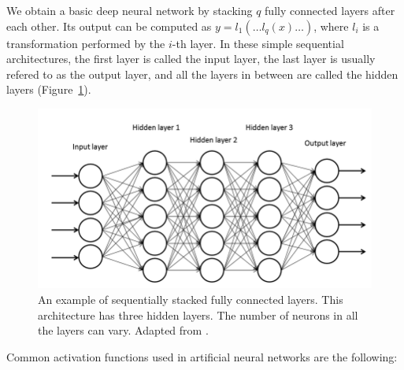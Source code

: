 We obtain a basic deep neural network by stacking $q$ fully connected layers after each other. Its output can be computed as $y = l_1(\dots l_q(x) \dots)$, where $l_i$ is a transformation performed by the $i$-th layer. In these simple sequential architectures, the first layer is called the input layer, the last layer is usually refered to as the output layer, and all the layers in between are called the hidden layers (Figure~\ref{img01:dnn}).

\begin{figure}[h]\centering
	\includegraphics[width=140mm]{../img/dnn.png}
	\caption{An example of sequentially stacked fully connected layers. This architecture has three hidden layers. The number of neurons in all the layers can vary. Adapted from \citep{miralles2017methodology}.}
	\label{img01:dnn}
\end{figure}


Common activation functions used in artificial neural networks are the following:



